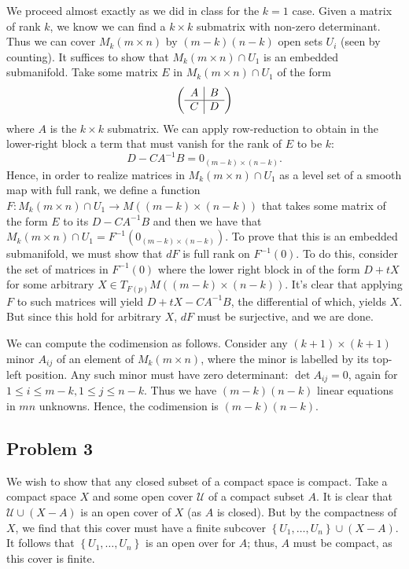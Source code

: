 \documentclass{../../mathnotes}
\begin{document}
We proceed almost exactly as we did in class for the $k=1$ case.
Given a matrix of rank $k$, we know we can find a $k\times k$ submatrix with non-zero determinant.
Thus we can cover $M_k(m\times n)$ by $(m-k)(n-k)$ open sets $U_i$ (seen by counting). It suffices to show that $M_k(m\times n)\cap U_1$
is an embedded submanifold. Take some matrix $E$ in $M_k(m\times n)\cap U_1$ of the form 
\begin{align*}
    \left(\begin{array}[]{c|c}
        A & B \\ \hline
        C & D
    \end{array}\right)
\end{align*}
where $A$ is the $k\times k$ submatrix. We can apply row-reduction to obtain in the lower-right block a
term that must vanish for the rank of $E$ to be $k$:
\[D-CA^{-1}B=0_{(m-k)\times(n-k)}.\]
Hence, in order to realize matrices in $M_k(m\times n)\cap U_1$ as a level set of a smooth map with full rank, we define
a function $F:M_k(m\times n)\cap U_1\to M( (m-k)\times(n-k))$ that takes some matrix of the form $E$ to its $D-CA^{-1}B$
and then we have that $M_k(m\times n)\cap U_1=F^{-1}(0_{(m-k)\times(n-k)})$. To prove that this is an embedded
submanifold, we must show that $dF$ is full rank on $F^{-1}(0)$. To do this, consider the set of matrices in $F^{-1}(0)$
where the lower right block in of the form $D+tX$ for some arbitrary $X\in T_{F(p)}M( (m-k)\times (n-k))$. It's clear that applying
$F$ to such matrices will yield $D+tX-CA^{-1}B$, the differential of which, yields $X$. But since this hold for arbitrary $X$,
$dF$ must be surjective, and we are done.

We can compute the codimension as follows. Consider any $(k+1)\times(k+1)$ minor $A_{ij}$ of an element of $M_k(m\times n)$,
where the minor is labelled by its top-left position. Any such minor must have zero determinant: $\det A_{ij}=0$, again for
$1\leq i\leq m-k, 1\leq j\leq n-k$. Thus we have $(m-k)(n-k)$ linear equations in $mn$ unknowns. Hence, the codimension is
$(m-k)(n-k)$.


\subsection*{Problem 3}

We wish to show that any closed subset of a compact space is compact. Take a compact space $X$ and some open cover
$\mathcal{U}$ of a compact subset $A$. It is clear that $\mathcal{U}\cup (X-A)$ is an open cover of $X$ (as
$A$ is closed). But by the compactness of $X$, we find that this cover must have a finite subcover $\left\{U_1,\ldots,U_n\right\}\cup (X-A)$.
It follows that $\left\{ U_1,\ldots,U_n \right\}$ is an open over for $A$; thus, $A$ must be compact, as this cover is finite.
\end{document}
